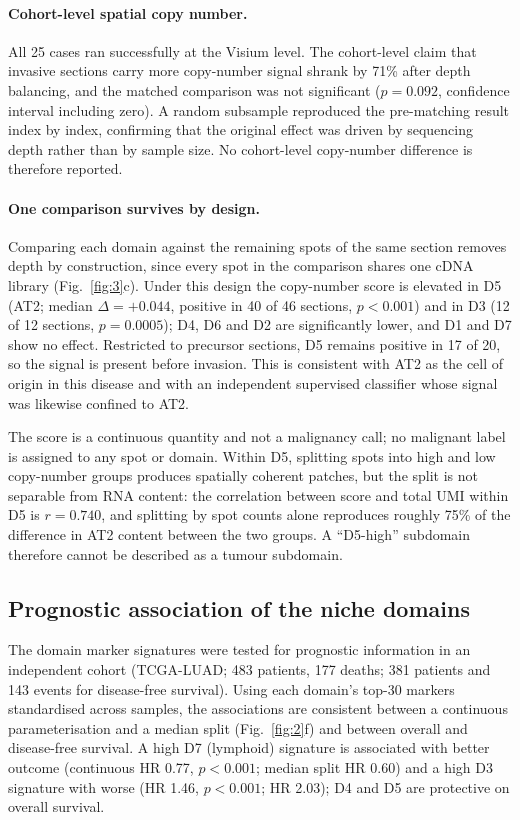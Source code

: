 \paragraph{Cohort-level spatial copy number.} All 25 cases ran successfully at the Visium
level. The cohort-level claim that invasive sections carry more copy-number signal shrank by
71\% after depth balancing, and the matched comparison was not significant ($p=0.092$,
confidence interval including zero). A random subsample reproduced the pre-matching result
index by index, confirming that the original effect was driven by sequencing depth rather
than by sample size. No cohort-level copy-number difference is therefore reported.

\paragraph{One comparison survives by design.} Comparing each domain against the remaining
spots of the same section removes depth by construction, since every spot in the comparison
shares one cDNA library (Fig.~\ref{fig:3}c). Under this design the copy-number score is
elevated in D5 (AT2; median $\Delta=+0.044$, positive in 40 of 46 sections, $p<0.001$) and
in D3 (12 of 12 sections, $p=0.0005$); D4, D6 and D2 are significantly lower, and D1 and D7
show no effect. Restricted to precursor sections, D5 remains positive in 17 of 20, so the
signal is present before invasion. This is consistent with AT2 as the cell of origin in this
disease and with an independent supervised classifier whose signal was likewise confined to
AT2.

The score is a continuous quantity and not a malignancy call; no malignant label is assigned
to any spot or domain. Within D5, splitting spots into high and low copy-number groups
produces spatially coherent patches, but the split is not separable from RNA content: the
correlation between score and total UMI within D5 is $r=0.740$, and splitting by spot counts
alone reproduces roughly 75\% of the difference in AT2 content between the two groups. A
``D5-high'' subdomain therefore cannot be described as a tumour subdomain.

\subsection{Prognostic association of the niche domains}

The domain marker signatures were tested for prognostic information in an independent cohort
(TCGA-LUAD; 483 patients, 177 deaths; 381 patients and 143 events for disease-free survival).
Using each domain's top-30 markers standardised across samples, the associations are
consistent between a continuous parameterisation and a median split (Fig.~\ref{fig:2}f) and
between overall and disease-free survival. A high D7 (lymphoid) signature is associated with
better outcome (continuous HR 0.77, $p<0.001$; median split HR 0.60) and a high D3 signature
with worse (HR 1.46, $p<0.001$; HR 2.03); D4 and D5 are protective on overall survival.

